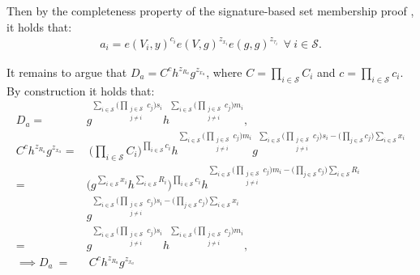 Then by the completeness property of the signature-based set membership proof \cite{RANGE-SET}, it holds that:
\begin{align*}
a_i = e(V_i,y)^{c_i}e(V,g)^{z_{x_i}}e(g,g)^{z_{\tau_i}} \:\: \forall \: i\in\mathcal{S}.
\end{align*}

It remains to argue that $D_a =C^ch^{z_{R_a}}g^{z_{x_a}}$, where $C=\prod_{i\in\mathcal{S}}C_i$ and $c=\prod_{i\in\mathcal{S}}c_i$. By construction it holds that:
\begin{align*}
D_a = &g ^ {\sum_{i\in\mathcal{S}} \Big(\prod_{\substack{j\in\mathcal{S}\\ j\neq i}}   c_j \Big)s_i} h^{\sum_{i\in\mathcal{S}} \Big(\prod_{\substack{j\in\mathcal{S}\\ j\neq i}}    c_j \Big)m_i}  ,
\\
 C^ch^{z_{R_a}}g^{z_{x_a}} =&\:  \Big( \prod_{i\in\mathcal{S}} C_i \Big)^{\prod_{i\in\mathcal{S}} c_i}h^ {\sum_{i\in\mathcal{S}} \Big( \prod_{\substack{j\in\mathcal{S}\\ j\neq i}}   c_j \Big)m_i}
g^{ \sum_{i\in\mathcal{S}} \Big( \prod_{\substack{j\in\mathcal{S}\\ j\neq i}}   c_j \Big)s_i - \big( \prod_{j\in\mathcal{S}} c_j \big) \sum_{i\in\mathcal{S}} x_i}
\\ 
 = &\Big( g^{\sum_{i\in\mathcal{S}} x_i} h^{\sum_{i\in\mathcal{S}} R_i}\Big)^{\prod_{i\in\mathcal{S}} c_i} h^{ \sum_{i\in\mathcal{S}} \Big( \prod_{\substack{j\in\mathcal{S}\\ j\neq i}} c_j \Big)m_i - \big( \prod_{j\in\mathcal{S}} c_j \Big) \sum_{i\in\mathcal{S}} R_i  }
 \\
 &g^{ \sum_{i\in\mathcal{S}} \Big( \prod_{\substack{j\in\mathcal{S}\\ j\neq i}}   c_j \Big)s_i - \big( \prod_{j\in\mathcal{S}} c_j \big) \sum_{i\in\mathcal{S}} x_i} \\
 =  &g^{ \sum_{i\in\mathcal{S}} \Big( \prod_{\substack{j\in\mathcal{S}\\ j\neq i}}  c_j \Big)s_i } h^{\sum_{i\in\mathcal{S}} \Big( \prod_{\substack{j\in\mathcal{S}\\ j\neq i}}   c_j \Big)m_i}  ,
\\
 \implies D_a \:=& \:C^ch^{z_{R_a}}g^{z_{x_a}}
\end{align*}

